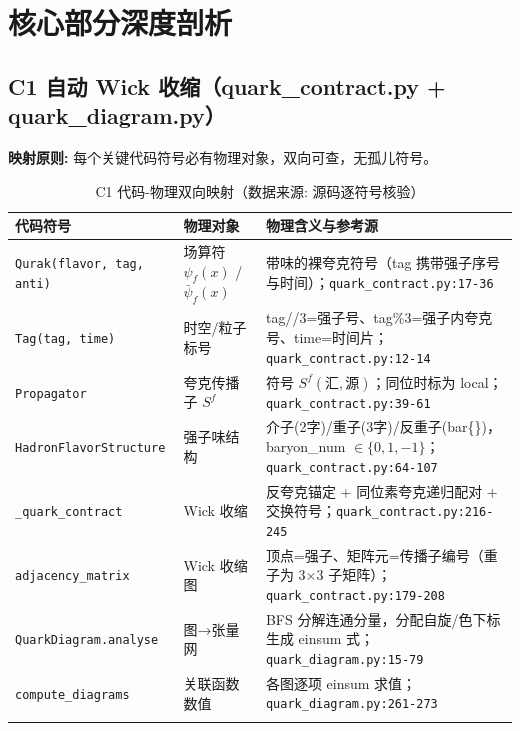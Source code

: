 \documentclass[UTF8]{ctexart}
\begin{document}
\section{核心部分深度剖析}

\subsection{C1 自动 Wick 收缩（quark\_contract.py + quark\_diagram.py）}

\begin{mapbox}
\textbf{映射原则:} 每个关键代码符号必有物理对象，双向可查，无孤儿符号。
\end{mapbox}

{\footnotesize\begin{xltabular}{\textwidth}{XlX}
\toprule
\textcolor{map}{代码符号} & 物理对象 & 物理含义与参考源 \\
\midrule
\endhead
\texttt{Qurak(flavor, tag, anti)} & 场算符 $\psi_f(x)$ / $\bar\psi_f(x)$ & 带味的裸夸克符号（tag 携带强子序号与时间）；\texttt{\nolinkurl{quark_contract.py:17-36}} \\
\texttt{Tag(tag, time)} & 时空/粒子标号 & tag//3=强子号、tag\%3=强子内夸克号、time=时间片；\texttt{\nolinkurl{quark_contract.py:12-14}} \\
\texttt{Propagator} & 夸克传播子 $S^f$ & 符号 $S^f(\text{汇},\text{源})$；同位时标为 local；\texttt{\nolinkurl{quark_contract.py:39-61}} \\
\texttt{HadronFlavorStructure} & 强子味结构 & 介子(2字)/重子(3字)/反重子(bar\{\})，baryon\_num $\in\{0,1,-1\}$；\texttt{\nolinkurl{quark_contract.py:64-107}} \\
\texttt{\nolinkurl{_quark_contract}} & Wick 收缩 & 反夸克锚定 + 同位素夸克递归配对 + 交换符号；\texttt{\nolinkurl{quark_contract.py:216-245}} \\
\texttt{\nolinkurl{adjacency_matrix}} & Wick 收缩图 & 顶点=强子、矩阵元=传播子编号（重子为 3$\times$3 子矩阵）；\texttt{\nolinkurl{quark_contract.py:179-208}} \\
\texttt{\nolinkurl{QuarkDiagram.analyse}} & 图→张量网 & BFS 分解连通分量，分配自旋/色下标生成 einsum 式；\texttt{\nolinkurl{quark_diagram.py:15-79}} \\
\texttt{\nolinkurl{compute_diagrams}} & 关联函数数值 & 各图逐项 einsum 求值；\texttt{\nolinkurl{quark_diagram.py:261-273}} \\
\bottomrule
\caption{C1 代码-物理双向映射（数据来源: 源码逐符号核验）}
\end{xltabular}}
\end{document}

